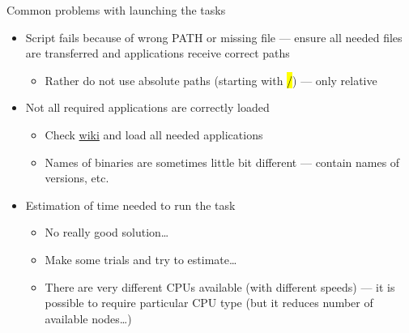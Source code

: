\documentclass[compress, ucs, xelatex, 11pt, xcolor=svgnames,
  hyperref={
    bookmarks=true,
    unicode=true,
    colorlinks=true,
    pdftitle={Linux, command line and MetaCentrum},
    plainpages=false,
    pdfauthor={Vojtech Zeisek},
    pdfsubject={Course about use of Linux command line, writing shell scripts and using MetaCentrum of CESNET},
    pdfcreator={XeLaTeX},
    pdfkeywords={Linux, GNU, BASH, shell, command line, MetaCentrum},
    linkcolor=DarkRed,
    anchorcolor=DarkBlue,
    citecolor=Indigo,
    filecolor=NavyBlue,
    menucolor=DarkMagenta,
    urlcolor=DarkBlue,
    pdftex},
  url={hyphens, lowtilde} %
  ]{beamer}
\renewcommand{\texttt}[1]{\hl{\ttfamily #1}}
\begin{document}
\begin{frame}{Common problems with launching the tasks}
  \begin{itemize}
    \item Script fails because of wrong PATH or missing file --- ensure all needed files are transferred and applications receive correct paths
    \begin{itemize}
      \item Rather do not use absolute paths (starting with \texttt{/}) --- only relative
    \end{itemize}
    \item Not all required applications are correctly loaded
    \begin{itemize}
      \item Check \href{https://wiki.metacentrum.cz/wiki/Kategorie:Applications}{wiki} and load all needed applications
      \item Names of binaries are sometimes little bit different --- contain names of versions, etc.
    \end{itemize}
    \item Estimation of time needed to run the task
    \begin{itemize}
      \item No really good solution\ldots
      \item Make some trials and try to estimate\ldots
      \item There are very different CPUs available (with different speeds) --- it is possible to require particular CPU type (but it reduces number of available nodes\ldots)
    \end{itemize}
  \end{itemize}
\end{frame}
\end{document}
